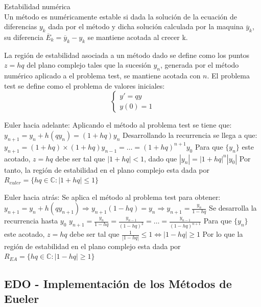 \documentclass{endm}
\begin{document}
Estabilidad numérica \\
Un método es numéricamente estable si dada la solución de la ecuación de diferencias $y_k$ dada por el método y dicha solución
calculada por la maquina $\overline{y}_k$, su diferencia $\overline{E}_k = \overline{y}_k - y_k$ se mantiene acotada al crecer k.

La región de estabilidad asociada a un método dado se define como los puntos $z = hq$ del plano complejo tales que 
la sucesión ${y_n}$, generada por el método numérico aplicado a el problema test, se mantiene acotada con $n$.
El problema test se define como el problema de valores iniciales:
\begin{equation*}
\begin{cases}
    y' = qy \\
    y(0) = 1
\end{cases}
\end{equation*}

Euler hacia adelante:
Aplicando el método al problema test se tiene que:
$y_{n+1} = y_n + h(qy_n) = (1 + hq)y_n$
Desarrollando la recurrencia se llega a que:
$y_{n+1} = (1 + hq)\times (1 + hq)y_{n-1} = \dots = (1 + hq)^{n+1}y_0$
Para que $\{y_n\}$ este acotado, $z = hq$ debe ser tal que $|1 + hq| <1$, dado que $|y_n| = |1 + hq|^n|y_0|$
Por tanto, la región de estabilidad en el plano complejo esta dada por $R_{euler} = \{hq \in \mathbb{C}:|1 + hq| \leq 1\}$

Euler hacia atrás:
Se aplica el método al problema test para obtener:
$y_{n+1} = y_n + h(qy_{n+1}) \Rightarrow y_{n+1}(1 - hq) = y_n \Rightarrow y_{n+1} = \frac{y_n}{1 - hq}$
Se desarrolla la recurrencia hasta $y_0$
$y_{n+1} = \frac{y_n}{1 - hq} = \frac{y_{n-1}}{(1 - hq)^2} = \dots = \frac{y_{n-1}}{(1 - hq)^{n+1}}$
Para que $\{y_n\}$ este acotado, $z = hq$ debe ser tal que $\frac{1}{|1 - hq|} \leq 1 \iff |1 - hq| \geq 1$
Por lo que la región de estabilidad en el plano complejo esta dada por $R_{EA} = \{hq \in \mathbb{C}:|1 - hq| \geq 1\}$


\subsection{EDO - Implementación de los Métodos de Eueler}


\end{document}
